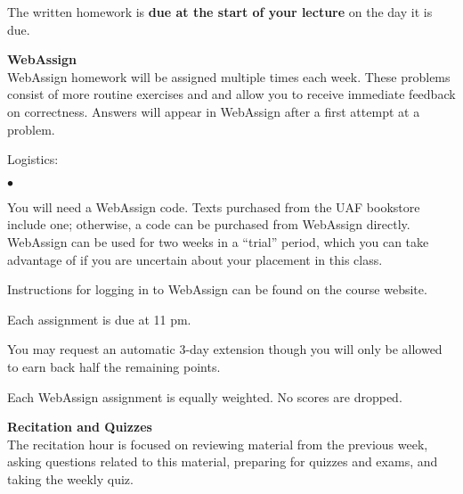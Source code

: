 \documentclass[12pt]{article}
\renewcommand{\emph}[1]{\textsf{\textbf{#1}}}
\newcommand{\localhead}[1]{\par\smallskip\textbf{#1}\nobreak\\}%
\def\heading#1{\localhead{\large\emph{#1}}}
\def\subheading#1{\localhead{\emph{#1}}}
\newenvironment{clist}%
{\bgroup\parskip 0pt\begin{list}{$\bullet$}{\partopsep 4pt\topsep 0pt\itemsep -2pt}}%
{\end{list}\egroup}%
\begin{document}
%
The written homework is \textbf{due at the start of your lecture} 
on the day it is due.
%

\subheading{WebAssign} 
WebAssign homework will be assigned multiple times each week. These problems consist of more routine exercises and and allow
you to receive immediate feedback on correctness. Answers will appear in WebAssign after a first attempt at a problem.
\newpage

Logistics:

\begin{clist}
\item You will need a WebAssign code.  Texts purchased from the UAF 
bookstore include one; otherwise, a code can be purchased from
WebAssign directly. WebAssign can be used for two weeks in a ``trial''
period, which you can take advantage of if you are uncertain about
your placement in this class.
\item Instructions for logging in to WebAssign can be found on the course website.
\item Each assignment is due at 11 pm. 
\item You may request an automatic 3-day extension though you will only be allowed to earn back half the remaining points. 
\item Each WebAssign assignment is equally weighted. No scores are dropped.
\end{clist}

\heading{Recitation and Quizzes}
The recitation hour is focused on reviewing material from the previous week, asking questions related to this material, preparing for quizzes and exams, and taking the weekly quiz.
\end{document}
